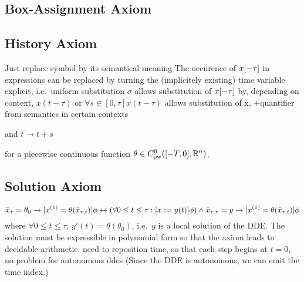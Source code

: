 \documentclass[10pt]{report}
\begin{document}
    \subsection{Box-Assignment Axiom}
        \label{box-assignment-axiom}

        \begin{calculus}
            \cinferenceRule[assignbb|$\mathrel{{:}{=}}$]{discrete assignment}{
                \linferenceRule[equiv]{
                    \asfml(\astrm) \land \left( \lforall{s\in[-\tau,0)}{\asfml(x(t+s))} \right)
                }{
                    \dbox{\hupdate{\humod{x}{\astrm}}}{\asfml(x)}
                }
            }{}
        \end{calculus}

    \subsection{History Axiom}
        \label{history-axiom}

        Just replace symbol by its semantical meaning
        The occurence of $x[-\tau]$ in expressions can be replaced by turning the (implicitely existing) time variable explicit, i.e.\
        uniform substitution $\sigma$
        allows substitution of $x[-\tau]$ by, depending on context, $x(t-\tau)$ or $\forall{s\in[0,\tau]}{x(t-\tau)}$
        allows substitution of x, +quantifier from semantics in certain contexts

        \begin{calculus}
        \end{calculus}
        and $t\rightarrow t+s$

        for a piecewise continuous function $\theta\in\statespace$.

    \subsection{Solution Axiom}
        \label{sec:solution-axiom}
        \begin{equation}
            \xbartau = \theta_0 \rightarrow [\D{x}=\theta(\xbartaut{t})]\phi
            \leftrightarrow
            \left(\forall 0\leq t\leq\tau: [x:= y(t)]\phi \right)
            \wedge \xbartaut{\tau} = y \rightarrow [\D{x}=\theta (\xbartaut{t})]\phi
        \end{equation}
        where $\forall 0\leq t\leq\tau$, $y'(t)=\theta(\theta_0)$, i.e.\ $y$ is a local solution of the DDE. The solution must be expressible in polynomial form so that the axiom leads to decidable arithmetic.
        need to reposition time, so that each step begins at $t=0$, no problem for autonomous ddes
        (Since the DDE is autonomous, we can emit the time index.)
\end{document}
